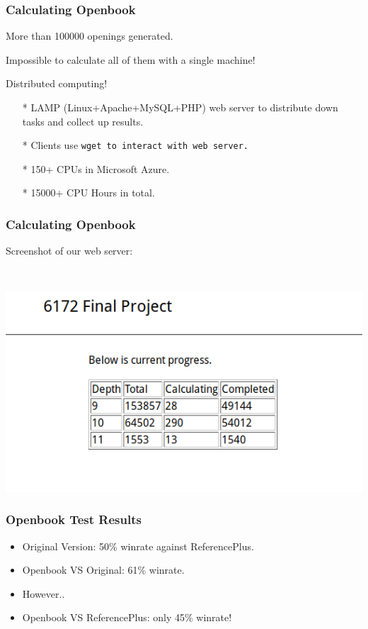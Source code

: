 \documentclass[10pt]{beamer}
\begin{document}
	\begin{frame}
		\frametitle{Calculating Openbook}
		More than \textcolor{dred}{100000} openings generated.

		Impossible to calculate all of them with a single machine!\pause

		\textcolor{fgreen}{Distributed computing!}

		\begin{itemize}
		\item[*] LAMP (Linux+Apache+MySQL+PHP) web server to distribute down tasks and collect up results.
		\item[*] Clients use \tt{wget} to interact with web server.
		\item[*] \textcolor{fgreen}{150+} CPUs in Microsoft Azure.
		\item[*] \textcolor{fgreen}{15000+} CPU Hours in total.
		\end{itemize}
	\end{frame}

	\begin{frame}
		\frametitle{Calculating Openbook}

		Screenshot of our web server:

		\

		\includegraphics[scale=0.5]{screenshot1.png}
	\end{frame}

	\begin{frame}
		\frametitle{Openbook Test Results}

		\begin{itemize}
		\item Original Version: \textcolor{fgreen}{50\%} winrate against ReferencePlus.
		\item Openbook VS Original: \textcolor{fgreen}{61\%} winrate.\pause
		\item However..
		\item Openbook VS ReferencePlus: only \textcolor{dred}{45\%} winrate!
		\end{itemize}
	\end{frame}
\end{document}
